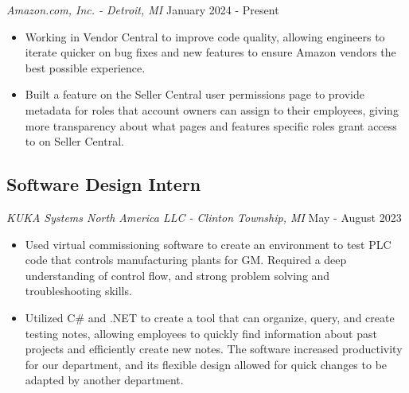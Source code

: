 \documentclass{article}
\begin{document}
\textit{Amazon.com, Inc. - Detroit, MI} \hfill {January 2024 - Present}

\begin{itemize}
	\item Working in Vendor Central to improve code quality, allowing engineers to iterate quicker on bug fixes and new features to ensure Amazon vendors the best possible experience.
	\item Built a feature on the Seller Central user permissions page to provide metadata for roles that account owners can assign to their employees, giving more transparency about what pages and features specific roles grant access to on Seller Central. 
		
\end{itemize}

\subsection*{Software Design Intern} 

\textit{KUKA Systems North America LLC - Clinton Township, MI} \hfill {May - August 2023}

\begin{itemize}
	\item Used virtual commissioning software to create an environment to test PLC code that controls manufacturing plants for GM. Required a deep understanding of control flow, and strong problem solving and troubleshooting skills.
	\item Utilized C\# and .NET to create a tool that can organize, query, and create testing notes, allowing employees to quickly find information about past projects and efficiently create new notes. The software increased productivity for our department, and its flexible design allowed for quick changes to be adapted by another department.
\end{itemize}




\end{document}
